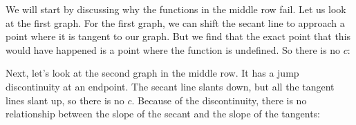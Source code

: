 \documentclass[pdftex, brazil, 12pt, twoside]{article}
\begin{document}
\begin{figure}[H]
  \begin{center}
    \label{fig:mvt-hypot-4}
  \end{center}
\end{figure}

We will start by discussing why the functions in the middle row
fail.
Let us look at the first graph.
For the first graph, we can shift the secant line
to approach a point where it is tangent to our graph.
But we find that the exact point that this would have happened
is a point where the function is undefined.
So there is no $c$:

\begin{figure}[H]
  \begin{center}
    \label{fig:mvt-hypot-5}
  \end{center}
\end{figure}

Next, let's look at the second graph in the middle row.
It has a jump discontinuity at an endpoint.
The secant line slants down, but all the tangent lines slant up,
so there is no $c$.
Because of the discontinuity, there
is no relationship between the slope of the secant
and the slope of the tangents:
\end{document}
